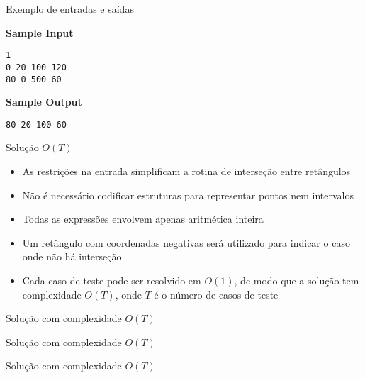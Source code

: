 \begin{frame}[fragile]{Exemplo de entradas e saídas}

\begin{minipage}[t]{0.5\textwidth}
\textbf{Sample Input}
\begin{verbatim}
1
0 20 100 120
80 0 500 60
\end{verbatim}
\end{minipage}
\begin{minipage}[t]{0.45\textwidth}
\textbf{Sample Output}
\begin{verbatim}
80 20 100 60
\end{verbatim}
\end{minipage}
\end{frame}

\begin{frame}[fragile]{Solução $O(T)$}

    \begin{itemize}
        \item As restrições na entrada simplificam a rotina de interseção entre retângulos
        \pause

        \item Não é necessário codificar estruturas para representar pontos nem intervalos
        \pause

        \item Todas as expressões envolvem apenas aritmética inteira
        \pause

        \item Um retângulo com coordenadas negativas será utilizado para indicar o caso onde
            não há interseção
        \pause

        \item Cada caso de teste pode ser resolvido em $O(1)$, de modo que a solução tem 
            complexidade $O(T)$, onde $T$ é o número de casos de teste
    \end{itemize}

\end{frame}

\begin{frame}[fragile]{Solução com complexidade $O(T)$}
\end{frame}

\begin{frame}[fragile]{Solução com complexidade $O(T)$}
\end{frame}

\begin{frame}[fragile]{Solução com complexidade $O(T)$}
\end{frame}

